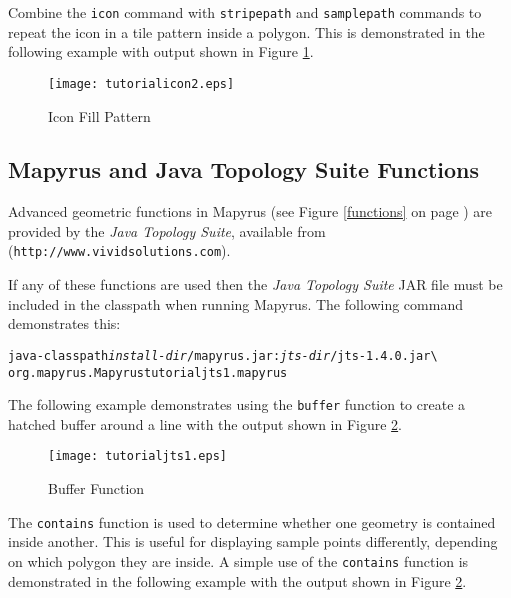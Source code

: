 Combine the \texttt{icon} command with
\texttt{stripepath} and
\texttt{samplepath} commands to
repeat the icon in a tile pattern inside a polygon.
This is demonstrated in the following example
with output shown in Figure \ref{tutorialicon2}.



\begin{figure}[htb]
\texttt{[image: tutorialicon2.eps]}
\caption{Icon Fill Pattern}
\label{tutorialicon2}
\end{figure}

\subsection{Mapyrus and Java Topology Suite Functions}
\label{tutorialjts}

Advanced geometric functions in Mapyrus
(see Figure \ref{functions} on page \pageref{functions})
are provided by the
\textit{Java Topology Suite},
available from
(\texttt{http://www.vividsolutions.com}).

If any of these functions are used then the
\textit{Java Topology Suite} JAR file must be included in the
classpath when running Mapyrus.  The following command demonstrates this:

\begin{alltt}
java -classpath \textit{install-dir}/mapyrus.jar:\textit{jts-dir}/jts-1.4.0.jar \textbackslash
  org.mapyrus.Mapyrus tutorialjts1.mapyrus
\end{alltt}

The following example demonstrates using the \texttt{buffer} function to
create a hatched buffer around a line
with the output shown in Figure \ref{tutorialjts1}.



\begin{figure}[htb]
\texttt{[image: tutorialjts1.eps]}
\caption{Buffer Function}
\label{tutorialjts1}
\end{figure}

The \texttt{contains} function is used to determine whether one geometry
is contained inside another.  This is useful for displaying sample points
differently, depending on which polygon they are inside.
A simple use of the \texttt{contains} function is
demonstrated in the following example
with the output shown in Figure \ref{tutorialjts1}.



